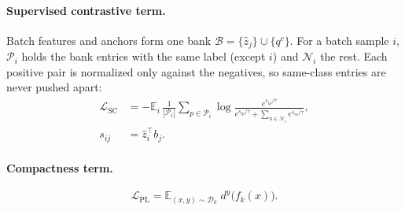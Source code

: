 \paragraph{Supervised contrastive term.}
Batch features and anchors form one bank $\mathcal{B}=\{\hat z_j\}\cup\{q^c\}$. For a batch sample $i$, $\mathcal{P}_i$ holds the bank entries with the same label (except $i$) and $\mathcal{N}_i$ the rest. Each positive pair is normalized only against the negatives, so same-class entries are never pushed apart:
\begin{equation}
\begin{aligned}
  \mathcal{L}_{\mathrm{SC}}&=-\mathbb{E}_i\,\frac{1}{|\mathcal{P}_i|}\sum_{p\in\mathcal{P}_i}\log\frac{e^{s_{ip}/\tau}}{e^{s_{ip}/\tau}+\sum_{n\in\mathcal{N}_i}e^{s_{in}/\tau}},\\
  s_{ij}&=\hat z_i^{\top}b_j .
\end{aligned}
\label{eq:sc}
\end{equation}

\paragraph{Compactness term.}
\begin{equation}
  \mathcal{L}_{\mathrm{PL}}=\mathbb{E}_{(x,y)\sim\mathcal{D}_k}\;d^{y}\big(f_k(x)\big).
  \label{eq:pl}
\end{equation}

